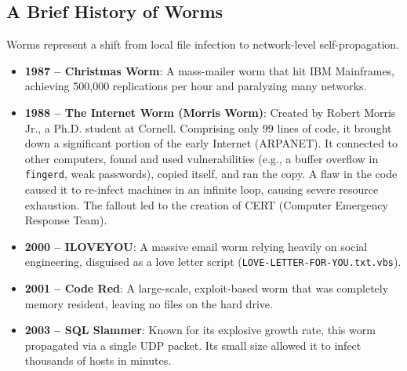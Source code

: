 \subsection{A Brief History of Worms}
Worms represent a shift from local file infection to network-level self-propagation.
\begin{itemize}
    \item \textbf{1987 -- Christmas Worm}: A mass-mailer worm that hit IBM Mainframes, achieving 500,000 replications per hour and paralyzing many networks.
    \item \textbf{1988 -- The Internet Worm (Morris Worm)}: Created by Robert Morris Jr., a Ph.D. student at Cornell. Comprising only 99 lines of code, it brought down a significant portion of the early Internet (ARPANET). It connected to other computers, found and used vulnerabilities (e.g., a buffer overflow in \texttt{fingerd}, weak passwords), copied itself, and ran the copy. A flaw in the code caused it to re-infect machines in an infinite loop, causing severe resource exhaustion. The fallout led to the creation of CERT (Computer Emergency Response Team).
    \item \textbf{2000 -- ILOVEYOU}: A massive email worm relying heavily on social engineering, disguised as a love letter script (\texttt{LOVE-LETTER-FOR-YOU.txt.vbs}).
    \item \textbf{2001 -- Code Red}: A large-scale, exploit-based worm that was completely memory resident, leaving no files on the hard drive.
    \item \textbf{2003 -- SQL Slammer}: Known for its explosive growth rate, this worm propagated via a single UDP packet. Its small size allowed it to infect thousands of hosts in minutes.
\end{itemize}

